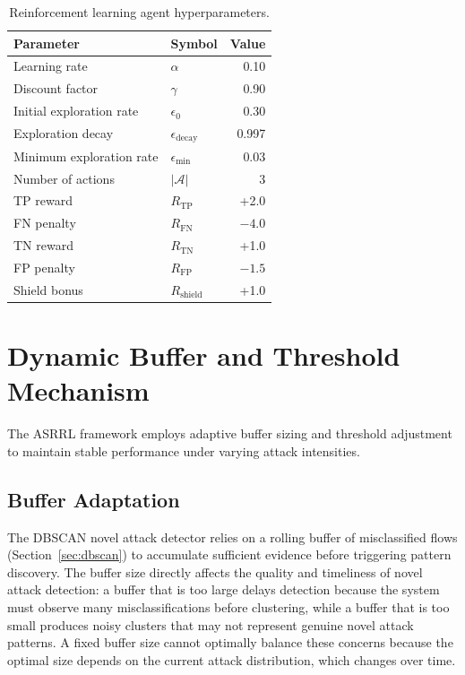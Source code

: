\documentclass[12pt, letterpaper, oneside]{report}
\newcommand{\ASRRL}{\textsc{ASRRL}}
\begin{document}
\begin{table}[htbp]
\centering
\caption{Reinforcement learning agent hyperparameters.}
\label{tab:rl_hyperparams}
\small
\begin{tabular}{llr}
\toprule
\textbf{Parameter} & \textbf{Symbol} & \textbf{Value} \\
\midrule
Learning rate & $\alpha$ & 0.10 \\
Discount factor & $\gamma$ & 0.90 \\
Initial exploration rate & $\epsilon_0$ & 0.30 \\
Exploration decay & $\epsilon_{\text{decay}}$ & 0.997 \\
Minimum exploration rate & $\epsilon_{\min}$ & 0.03 \\
Number of actions & $|\mathcal{A}|$ & 3 \\
TP reward & $R_{\text{TP}}$ & +2.0 \\
FN penalty & $R_{\text{FN}}$ & $-4.0$ \\
TN reward & $R_{\text{TN}}$ & +1.0 \\
FP penalty & $R_{\text{FP}}$ & $-1.5$ \\
Shield bonus & $R_{\text{shield}}$ & +1.0 \\
\bottomrule
\end{tabular}
\end{table}


\section{Dynamic Buffer and Threshold Mechanism}
\label{sec:dynamic_buffer}

The \ASRRL{} framework employs adaptive buffer sizing and threshold adjustment to maintain stable performance under varying attack intensities.

\subsection{Buffer Adaptation}

The DBSCAN novel attack detector relies on a rolling buffer of misclassified flows (Section~\ref{sec:dbscan}) to accumulate sufficient evidence before triggering pattern discovery. The buffer size directly affects the quality and timeliness of novel attack detection: a buffer that is too large delays detection because the system must observe many misclassifications before clustering, while a buffer that is too small produces noisy clusters that may not represent genuine novel attack patterns. A fixed buffer size cannot optimally balance these concerns because the optimal size depends on the current attack distribution, which changes over time.
\end{document}
